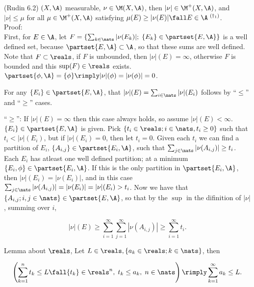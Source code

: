 (Rudin 6.2) $(X, \A)$ measurable, $\nu \in \M(X,\A)$, then $|\nu| \in \M^+(X, \A)$, and $|\nu| \le \mu$ for all $\mu  \in \M^+(X, \A)$ satisfying  $\mu(E)  \ge |\nu(E)| \fall E \in \A \; {}^{(\dagger_1)} $. \\


Proof: \\

\noindent
First, for $E \in \A$, let $ F = \{  \sum_{k \in \nats} |\nu(E_k)| ; \; \{ E_k\} \in \partset{E, \A}  \}$ is a well defined set, because $\partset{E, \A} \subset \A$, so that these sums are well defined. Note that $F \subset \reals$, if $F$ is unbounded, then $|\nu|(E) = \infty$, otherwise $F$ is bounded and this $\sup(F) \in \reals$ exists. \\


\noindent
 $\partset{\phi, \A} = \{ \phi \} \rimply |\nu|(\phi) = |\nu(\phi)| = 0$. 

\noindent 
For any $\{ E_i \} \in \partset{E, \A}$, that $|\nu|(E) = \sum_{i \in \nats} |\nu|(E_i)$ follows by ``$\le$'' and ``$\ge$'' cases. \\


\noindent


\noindent
``$\ge$'': If $|\nu|(E) = \infty$ then this case always holds, so assume $|\nu|(E) < \infty$. $\{ E_i \} \in \partset{ E, \A }$ is given. Pick $\{ t_i \in \reals; i \in \nats, t_i \ge 0 \}$ such that $t_i < |\nu|(E_i)$, but if $|\nu|(E_i) = 0$, then let $t_i = 0$. Given each $t_i$ we can find a partition of $E_i$, $\{A_{i,j} \} \in \partset{E_i, \A}$, such that $\sum_{j \in \nats} |\nu(A_{i,j})| \ge t_i$. Each $E_i$ has atleast one well defined partition; at a minimum $\{E_i, \phi \} \in \partset{E_i, \A}$. If this is the only partition in $\partset{E_i, \A}$, then $|\nu|(E_i) = |\nu(E_i)|$, and in this case $\sum_{j \in \nats} |\nu(A_{i,j})| = |\nu(E_i)| = |\nu|(E_i) > t_i$.  Now we have that $\{ A_{i,j}; i,j \in \nats \} \in \partset{E, \A}$, so that by the $\sup$ in the difinition of $|\nu|$, summing over $i$,

$$    |\nu|(E) \ge \sum_{i =1 }^\infty \sum_{j =1}^\infty |\nu(A_{i,j})| \ge \sum_{i=1}^\infty t_i. $$

\noindent
Lemma about $\reals$, Let $L \in \reals, \{ a_k \in \reals; k \in \nats \}$, then

$$
\left(  \sum_{k=1}^n t_k \le L  \fall \{ t_k \} \in \reals^n, \; t_k \le a_k, \; n \in \nats  \right) \rimply \sum_{k = 1} ^ \infty a_k \le L.
$$

